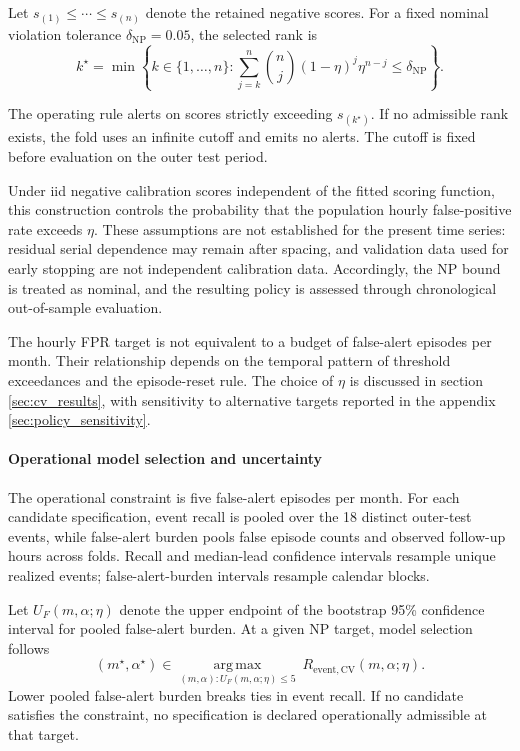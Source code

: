 \documentclass[a4paper,fleqn]{cas-sc}
\begin{document}
Let $s_{(1)}\leq\cdots\leq s_{(n)}$ denote the retained negative scores.
For a fixed nominal violation tolerance $\delta_{\mathrm{NP}}=0.05$,
the selected rank is
\begin{equation}
    k^\star
    =
    \min\left\{
        k\in\{1,\ldots,n\}:
        \sum_{j=k}^{n}
        \binom{n}{j}(1-\eta)^j\eta^{n-j}
        \leq\delta_{\mathrm{NP}}
    \right\}.
    \label{eq:np_rank_selection}
\end{equation}

The operating rule alerts on scores strictly exceeding $s_{(k^\star)}$. If no admissible rank exists, the fold uses an infinite cutoff and emits no alerts. The cutoff is fixed before evaluation on the outer test period.

Under iid negative calibration scores independent of the fitted scoring function, this construction controls the probability that the population hourly false-positive rate exceeds $\eta$.
These assumptions are not established for the present time series: residual serial dependence may remain after spacing, and validation data used for early stopping are not independent calibration data. Accordingly, the NP bound is treated as nominal, and the resulting policy is assessed through chronological out-of-sample evaluation.

The hourly FPR target is not equivalent to a budget of false-alert episodes per month. Their relationship depends on the temporal pattern of threshold exceedances and the episode-reset rule. The choice of $\eta$ is discussed in section \ref{sec:cv_results}, with sensitivity to alternative targets reported in the appendix \ref{sec:policy_sensitivity}.

\paragraph{Operational model selection and uncertainty}

The operational constraint is five false-alert episodes per month. For each candidate specification, event recall is pooled over the 18 distinct outer-test events, while false-alert burden pools false episode counts and observed follow-up hours across folds. Recall and median-lead confidence intervals resample unique realized events;
false-alert-burden intervals resample calendar blocks.

Let $U_F(m,\alpha;\eta)$ denote the upper endpoint of the bootstrap
95\% confidence interval for pooled false-alert burden. At a given
NP target, model selection follows
\begin{equation}
    (m^\star,\alpha^\star)
    \in
    \underset{
        (m,\alpha):
        U_F(m,\alpha;\eta)\leq5
    }{\operatorname{arg\,max}}
    \ R_{\mathrm{event,CV}}(m,\alpha;\eta).
    \label{eq:operational_model_selection}
\end{equation}
Lower pooled false-alert burden breaks ties in event recall.
If no candidate satisfies the constraint, no specification is declared operationally admissible at that target.
\end{document}
